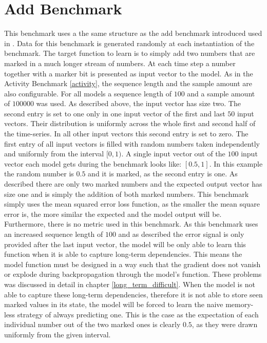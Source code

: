 \documentclass[draft,final]{vutinfth} %
\begin{document}
    \section{Add Benchmark} \label{add}
    This benchmark uses a the same structure as the add benchmark introduced used in \cite{UnitaryRNNs}.
    Data for this benchmark is generated randomly at each instantiation of the benchmark.
    The target function to learn is to simply add two numbers that are marked in a much longer stream of numbers.
    At each time step a number together with a marker bit is presented as input vector to the model.
    As in the Activity Benchmark \ref{activity}, the sequence length and the sample amount are also configurable.
    For all models a sequence length of $100$ and a sample amount of $100000$ was used.
    As described above, the input vector has size two.
    The second entry is set to one only in one input vector of the first and last $50$ input vectors.
    Their distribution is uniformly across the whole first and second half of the time-series.
    In all other input vectors this second entry is set to zero. 
    The first entry of all input vectors is filled with random numbers taken independently and uniformly from the interval $[0,1)$.
    A single input vector out of the $100$ input vector each model gets during the benchmark looks like: $[0.5,1]$.
    In this example the random number is $0.5$ and it is marked, as the second entry is one.
    As described there are only two marked numbers and the expected output vector has size one and is simply the addition of both marked numbers.
    This benchmark simply uses the mean squared error loss function, as the smaller the mean square error is, the more similar the expected and the model output will be.
    Furthermore, there is no metric used in this benchmark.
    As this benchmark uses an increased sequence length of $100$ and as described the error signal is only provided after the last input vector, the model will be only able to learn this function when it is able to capture long-term dependencies.
    This means the model function must be designed in a way such that the gradient does not vanish or explode during backpropagation through the model's function.
    These problems was discussed in detail in chapter \ref{long_term_difficult}.
    When the model is not able to capture these long-term dependencies, therefore it is not able to store seen marked values in its state, the model will be forced to learn the naive memory-less strategy of always predicting one.
    This is the case as the expectation of each individual number out of the two marked ones is clearly $0.5$, as they were drawn uniformly from the given interval.
\end{document}
